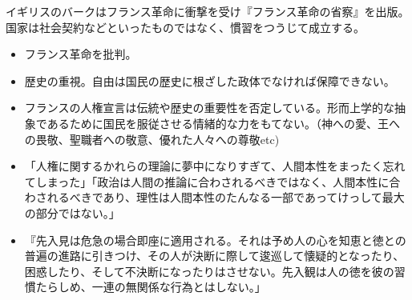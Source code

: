 \documentclass[uplatex,dvipdfmx]{jsarticle} \usepackage{mystyle}%
\begin{document}
イギリスのバークはフランス革命に衝撃を受け『フランス革命の省察』を出版。国家は社会契約などといったものではなく、慣習をつうじて成立する。

\begin{itemize}
\item フランス革命を批判。
\item 歴史の重視。自由は国民の歴史に根ざした政体でなければ保障できない。
\item フランスの人権宣言は伝統や歴史の重要性を否定している。形而上学的な抽象であるために国民を服従させる情緒的な力をもてない。（神への愛、王への畏敬、聖職者への敬意、優れた人々への尊敬etc)
\item 「人権に関するかれらの理論に夢中になりすぎて、人間本性をまったく忘れてしまった」「政治は人間の推論に合わされるべきではなく、人間本性に合わされるべきであり、理性は人間本性のたんなる一部であってけっして最大の部分ではない。」
\item 『先入見は危急の場合即座に適用される。それは予め人の心を知恵と徳との普遍の進路に引きつけ、その人が決断に際して逡巡して懐疑的となったり、困惑したり、そして不決断になったりはさせない。先入観は人の徳を彼の習慣たらしめ、一連の無関係な行為とはしない。」
\end{itemize}





\end{document}
